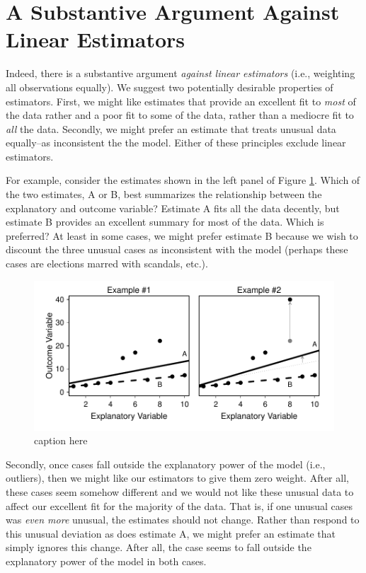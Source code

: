 \documentclass[10pt]{article}
\begin{document}
\section*{A Substantive Argument Against Linear Estimators}

Indeed, there is a substantive argument \textit{against linear estimators} (i.e., weighting all observations equally). We suggest two potentially desirable properties of estimators. First, we might like estimates that provide an excellent fit to \textit{most} of the data rather and a poor fit to some of the data, rather than a mediocre fit to \textit{all} the data. Secondly, we might prefer an estimate that treats unusual data equally--as inconsistent the the model. Either of these principles exclude linear estimators.

For example, consider the estimates shown in the left panel of Figure \ref{fig:best-fit-illustration}. Which of the two estimates, A or B, best summarizes the relationship between the explanatory and outcome variable? Estimate A fits all the data decently, but estimate B provides an excellent summary for most of the data. Which is preferred? At least in some cases, we might prefer estimate B because we wish to discount the three unusual cases as inconsistent with the model (perhaps these cases are elections marred with scandals, etc.).

\begin{figure}[H]
\begin{center}
\includegraphics[scale = .7]{figs/best-fit-illustration.pdf}
\caption{caption here}\label{fig:best-fit-illustration}
\end{center}
\end{figure}

Secondly, once cases fall outside the explanatory power of the model (i.e., outliers), then we might like our estimators to give them zero weight. After all, these cases seem somehow different and we would not like these unusual data to affect our excellent fit for the majority of the data. That is, if one unusual cases was \textit{even more} unusual, the estimates should not change. Rather than respond to this unusual deviation as does estimate A, we might prefer an estimate that simply ignores this change. After all, the case seems to fall outside the explanatory power of the model in both cases.
\end{document}
